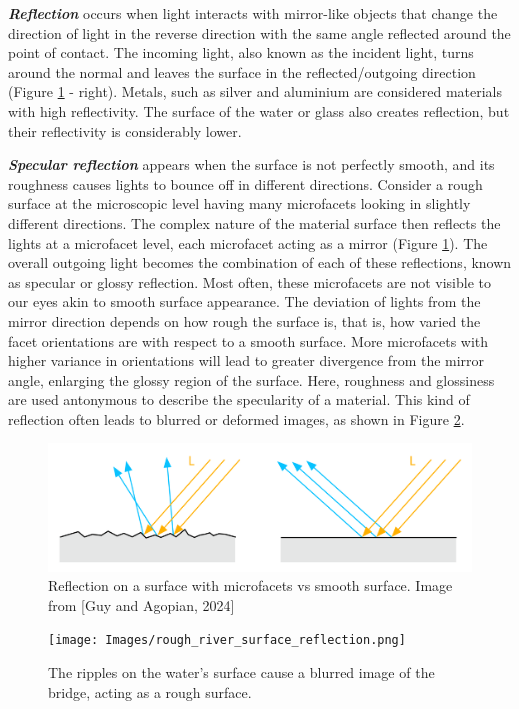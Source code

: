 \textbf{\textit{Reflection}} occurs when light interacts with mirror-like objects that change the direction of light in the reverse direction with the same angle reflected around the point of contact. The incoming light, also known as the incident light, turns around the normal and leaves the surface in the reflected/outgoing direction (Figure \ref{fig:microfacet} - right). Metals, such as silver and aluminium are considered materials with high reflectivity. The surface of the water or glass also creates reflection, but their reflectivity is considerably lower.

\textbf{\textit{Specular reflection}} appears when the surface is not perfectly smooth, and its roughness causes lights to bounce off in different directions. Consider a rough surface at the microscopic level having many microfacets looking in slightly different directions. The complex nature of the material surface then reflects the lights at a microfacet level, each microfacet acting as a mirror (Figure \ref{fig:microfacet}). The overall outgoing light becomes the combination of each of these reflections, known as specular or glossy reflection. Most often, these microfacets are not visible to our eyes akin to smooth surface appearance. The deviation of lights from the mirror direction depends on how rough the surface is, that is, how varied the facet orientations are with respect to a smooth surface. More microfacets with higher variance in orientations will lead to greater divergence from the mirror angle, enlarging the glossy region of the surface. Here, roughness and glossiness are used antonymous to describe the specularity of a material. This kind of reflection often leads to blurred or deformed images, as shown in Figure \ref{fig:water_reflection}. 


\begin{figure}
\includegraphics[width=\linewidth]{Images/diagram_microfacet.png}
\caption{Reflection on a surface with microfacets vs smooth surface. Image from [Guy and Agopian, 2024]}\label{fig:microfacet}
\end{figure} 

\begin{figure}
\texttt{[image: Images/rough\_river\_surface\_reflection.png]}
\caption{The ripples on the water's surface cause a blurred image of the bridge, acting as a rough surface.}\label{fig:water_reflection}
\end{figure}  

